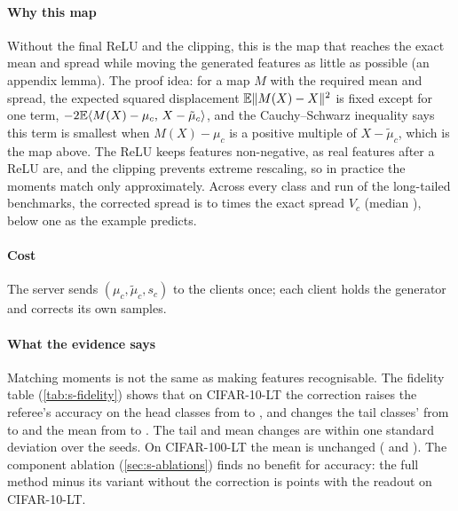 \paragraph{Why this map} Without the final ReLU and the clipping, this is the map that reaches the exact mean and
spread while moving the generated features as little as possible (an appendix lemma). The proof idea: for a map $M$
with the required mean and spread, the expected squared displacement $\mathbb{E}\|M(X)-X\|^2$ is fixed except for one term,
$-2\mathbb{E}\langle M(X)-\mu_c,\,X-\tilde\mu_c\rangle$, and the Cauchy--Schwarz inequality says this term is smallest when
$M(X)-\mu_c$ is a positive multiple of $X-\tilde\mu_c$, which is the map above. The ReLU keeps features non-negative, as
real features after a ReLU are, and the clipping prevents extreme rescaling, so in practice the moments match only
approximately. Across every class and run of the long-tailed benchmarks, the corrected spread is 
to  times the exact spread $V_c$ (median ), below one as the example
predicts.

\paragraph{Cost} The server sends $(\mu_c,\tilde\mu_c,s_c)$ to the clients once; each client holds the generator and
corrects its own samples.

\paragraph{What the evidence says} Matching moments is not the same as making features recognisable. The fidelity
table (\cref{tab:s-fidelity}) shows that on CIFAR-10-LT the correction raises the referee's accuracy on the head
classes from  to , and changes the
tail classes' from  to  and the
mean from  to . The tail and mean
changes are within one standard deviation over the seeds. On CIFAR-100-LT the mean is unchanged
( and ). The component ablation
(\cref{sec:s-ablations}) finds no benefit for accuracy: the full method minus its variant without the correction is
 points with the readout on CIFAR-10-LT.

